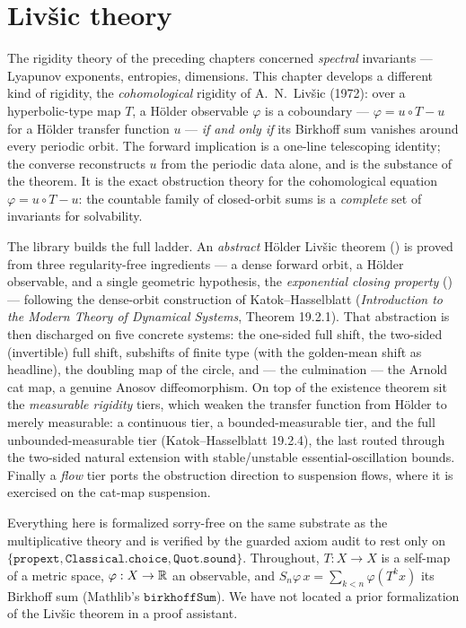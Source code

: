 \chapter{Livšic theory}
\label{ch:livsic}

The rigidity theory of the preceding chapters concerned \emph{spectral} invariants --- Lyapunov
exponents, entropies, dimensions. This chapter develops a different kind of rigidity, the
\emph{cohomological} rigidity of A.~N.~Livšic (1972): over a hyperbolic-type map \(T\), a Hölder
observable \(\varphi\) is a coboundary --- \(\varphi = u\circ T - u\) for a Hölder transfer function
\(u\) --- \emph{if and only if} its Birkhoff sum vanishes around every periodic orbit. The forward
implication is a one-line telescoping identity; the converse reconstructs \(u\) from the periodic
data alone, and is the substance of the theorem. It is the exact obstruction theory for the
cohomological equation \(\varphi = u\circ T - u\): the countable family of closed-orbit sums is a
\emph{complete} set of invariants for solvability.

The library builds the full ladder. An \emph{abstract} Hölder Livšic theorem
() is proved from three regularity-free ingredients --- a dense forward orbit,
a Hölder observable, and a single geometric hypothesis, the \emph{exponential closing property}
() --- following the dense-orbit construction of Katok--Hasselblatt
(\emph{Introduction to the Modern Theory of Dynamical Systems}, Theorem 19.2.1). That abstraction is
then discharged on five concrete systems: the one-sided full shift, the two-sided (invertible) full
shift, subshifts of finite type (with the golden-mean shift as headline), the doubling map of the
circle, and --- the culmination --- the Arnold cat map, a genuine Anosov diffeomorphism. On top of
the existence theorem sit the \emph{measurable rigidity} tiers, which weaken the transfer function
from Hölder to merely measurable: a continuous tier, a bounded-measurable tier, and the full
unbounded-measurable tier (Katok--Hasselblatt 19.2.4), the last routed through the two-sided natural
extension with stable/unstable essential-oscillation bounds. Finally a \emph{flow} tier ports the
obstruction direction to suspension flows, where it is exercised on the cat-map suspension.

Everything here is formalized sorry-free on the same substrate as the multiplicative theory and is
verified by the guarded axiom audit to rest only on
\(\{\texttt{propext},\texttt{Classical.choice},\texttt{Quot.sound}\}\). Throughout, \(T:X\to X\) is
a self-map of a metric space, \(\varphi:X\to\mathbb{R}\) an observable, and \(S_n\varphi\,x =
\sum_{k<n}\varphi(T^k x)\) its Birkhoff sum (Mathlib's \(\texttt{birkhoffSum}\)). We have not located a prior
formalization of the Livšic theorem in a proof assistant.

